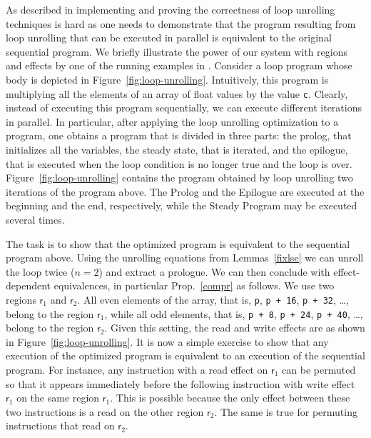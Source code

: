 \documentclass[orivec]{llncs}
\newcommand{\regid}{\ensuremath{\mathsf{r}}}
\begin{document}
As described in \cite{tristan10popl} implementing and proving the
correctness of loop unrolling techniques is hard as
one needs to demonstrate that the program resulting from loop unrolling
that can be executed in parallel is equivalent to the original sequential
program. We briefly illustrate the power of our system with regions and
effects by one of the running examples in \cite{tristan10popl}. Consider
a loop program whose body is depicted in Figure~\ref{fig:loop-unrolling}.
Intuitively, this program is multiplying all the elements of an array of 
float values by the value \texttt{c}. Clearly, instead of executing this
program sequentially, we can execute different iterations in parallel. 
In particular, after applying the loop unrolling optimization to a program,
one obtains a program that is divided in three parts: the prolog, that
initializes all the variables, the steady state, that is iterated, and the
epilogue, that is executed when the loop condition is no longer true and
the loop is over. Figure~\ref{fig:loop-unrolling} contains the program
obtained by loop unrolling two iterations of the program above. The Prolog
and the Epilogue are executed at the beginning and the end, respectively,
while the Steady Program may be executed several times. 

The task is to show that the optimized program is equivalent to the
sequential program above. Using the unrolling equations from
Lemmas~\ref{fixlse} we can unroll the loop twice
($n=2$) and extract a prologue. We can then conclude with
effect-dependent equivalences, in particular Prop.~\ref{compr} as
follows. We use two regions $\regid_1$
and $\regid_2$. All even elements of the array, that is, \texttt{p},
\texttt{p + 16}, \texttt{p + 32}, \ldots, belong to the region $\regid_1$,
while all odd elements, that is, \texttt{p + 8},
\texttt{p + 24}, \texttt{p + 40}, \ldots, belong to the region $\regid_2$.
Given this setting, the read and write effects are as shown in
Figure~\ref{fig:loop-unrolling}. It is now a simple exercise to show that
any execution of the optimized program is equivalent to an execution of
the sequential program. For instance, any instruction with a read effect 
on $\regid_1$ can be permuted so that it appears immediately before the
following instruction with write effect $\regid_1$ on the same region
$\regid_1$. This is possible because the only effect between these two
instructions is a read on the other region $\regid_2$. The same is true
for permuting instructions that read on $\regid_2$. 
\fi
\end{document}
